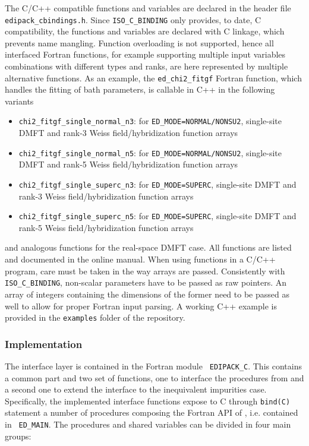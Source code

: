 \documentclass[edipack2.tex]{subfiles}
\begin{document}
The C/C++ compatible functions and variables 
are declared in the header file  {\tt edipack\_cbindings.h}.
Since {\tt ISO\_C\_BINDING} only provides, to date, C compatibility, the 
functions and variables are declared with C linkage, which prevents name mangling.
Function overloading is not supported, hence all interfaced Fortran functions,
for example supporting multiple input variables combinations with different types
and ranks, are here represented by multiple alternative functions.
As an example, the {\tt ed\_chi2\_fitgf} Fortran function, which handles the fitting of bath parameters, is callable in C++ in the following variants
\begin{itemize}
    \item  {\tt chi2\_fitgf\_single\_normal\_n3}: for {\tt ED\_MODE=NORMAL/NONSU2}, single-site DMFT and rank-3 Weiss field/hybridization function arrays
    \item  {\tt chi2\_fitgf\_single\_normal\_n5}: for {\tt ED\_MODE=NORMAL/NONSU2}, single-site DMFT and rank-5 Weiss field/hybridization function arrays
    \item  {\tt chi2\_fitgf\_single\_superc\_n3}: for {\tt ED\_MODE=SUPERC}, single-site DMFT and rank-3 Weiss field/hybridization function arrays
    \item  {\tt chi2\_fitgf\_single\_superc\_n5}: for {\tt ED\_MODE=SUPERC}, single-site DMFT and rank-5 Weiss field/hybridization function arrays
\end{itemize}
and analogous functions for the real-space DMFT case. All functions are listed and documented in the online manual.
When using \NAME functions in a C/C++ program, care must be taken in the way arrays are passed. Consistently with {\tt ISO\_C\_BINDING}, non-scalar parameters have to be passed as raw pointers. An array of integers containing the dimensions of the former need to be passed as well to allow for proper Fortran input parsing. A working C++ example is provided in the {\tt examples} folder of the \NAME repository.

\subsubsection{Implementation}\label{sSecInteropCbindingsImplementation}
The interface layer is contained in the Fortran module {\tt
  EDIPACK\_C}. This contains a common part and two set of functions,
one to interface the procedures from \NAME and a second
one to extend the interface to the inequivalent impurities case.
Specifically, the implemented interface functions expose to C through
{\tt bind(C)} statement a number of
procedures composing the Fortran API of \NAME, i.e. contained in {\tt
  ED\_MAIN}. The procedures and shared variables can be divided in four main groups:
\end{document}
